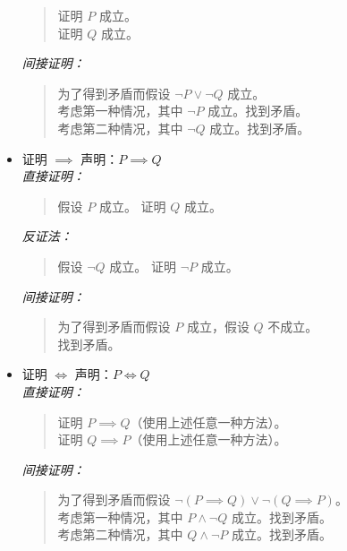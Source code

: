 \begin{itemize}
            \begin{quote}
                证明 $P$ 成立。\\
                证明 $Q$ 成立。
            \end{quote}
            \emph{间接证明：}
            \begin{quote}
                为了得到矛盾而假设 $\neg P \lor \neg Q$ 成立。\\
                考虑第一种情况，其中 $\neg P$ 成立。找到矛盾。\\
                考虑第二种情况，其中 $\neg Q$ 成立。找到矛盾。
            \end{quote}
    \item 证明 $\implies$ 声明：$P \implies Q$\\
            \emph{直接证明：}
            \begin{quote}
                假设 $P$ 成立。 证明 $Q$ 成立。
            \end{quote}
            \emph{反证法：}
            \begin{quote}
                假设 $\neg Q$ 成立。 证明 $\neg P$ 成立。
            \end{quote}
            \emph{间接证明：}
            \begin{quote}
                为了得到矛盾而假设 $P$ 成立，假设 $Q$ 不成立。\\
                找到矛盾。
            \end{quote}
    \item 证明 $\iff$ 声明：$P \iff Q$\\
            \emph{直接证明：}
            \begin{quote}
                证明 $P \implies Q$（使用上述任意一种方法）。\\
                证明 $Q \implies P$（使用上述任意一种方法）。
            \end{quote}
            \emph{间接证明：}
            \begin{quote}
                为了得到矛盾而假设 $\neg (P \implies Q) \lor \neg (Q \implies P)$。\\
                考虑第一种情况，其中 $P \land \neg Q$ 成立。找到矛盾。\\
                考虑第二种情况，其中 $Q \land \neg P$ 成立。找到矛盾。
            \end{quote}
\end{itemize}
